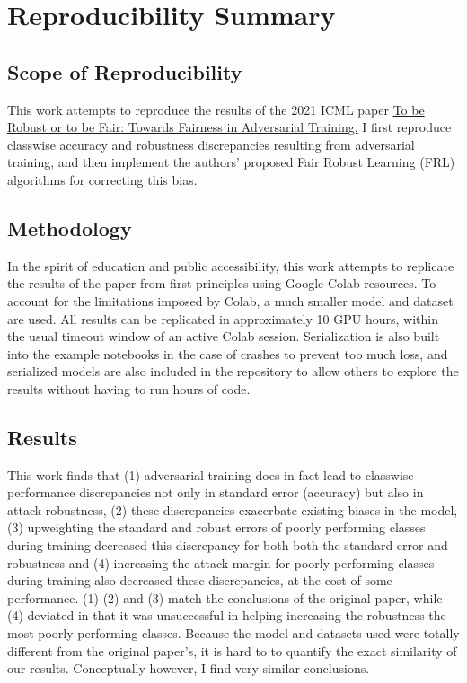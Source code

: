 \section*{\centering Reproducibility Summary}

\subsection*{Scope of Reproducibility}

This work attempts to reproduce the results of the 2021 ICML paper \href{https://arxiv.org/pdf/2010.06121.pdf}{To be Robust or to be Fair: Towards Fairness in Adversarial Training.} I first reproduce classwise accuracy and robustness discrepancies resulting from adversarial training, and then implement the authors' proposed Fair Robust Learning (FRL) algorithms for correcting this bias. 

\subsection*{Methodology}

In the spirit of education and public accessibility, this work attempts to replicate the results of the paper from first principles using Google Colab resources. To account for the limitations imposed by Colab, a much smaller model and dataset are used. All results can be replicated in approximately 10 GPU hours, within the usual timeout window of an active Colab session. Serialization is also built into the example notebooks in the case of crashes to prevent too much loss, and serialized models are also included in the repository to allow others to explore the results without having to run hours of code. 

\subsection*{Results}

This work finds that (1) adversarial training does in fact lead to classwise performance discrepancies not only in standard error (accuracy) but also in attack robustness, (2) these discrepancies exacerbate existing biases in the model, (3) upweighting the standard and robust errors of poorly performing classes during training decreased this discrepancy for both both the standard error and robustness and (4) increasing the attack margin for poorly performing classes during training also decreased these discrepancies, at the cost of some performance. (1) (2) and (3) match the conclusions of the original paper, while (4) deviated in that it was unsuccessful in helping increasing the robustness the most poorly performing classes. Because the model and datasets used were totally different from the original paper's, it is hard to to quantify the exact similarity of our results. Conceptually however, I find very similar conclusions.  

